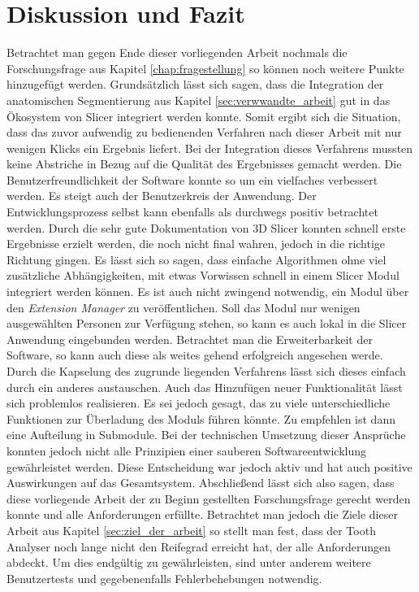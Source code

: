 \chapter{Diskussion und Fazit}
\label{chap:diskussion} Betrachtet man gegen Ende dieser vorliegenden Arbeit nochmals
die Forschungsfrage aus Kapitel \ref{chap:fragestellung} so können noch weitere Punkte
hinzugefügt werden. Grundsätzlich lässt sich sagen, dass die Integration der anatomischen
Segmentierung aus Kapitel \ref{sec:verwwandte_arbeit} gut in das Ökosystem von Slicer
integriert werden konnte. Somit ergibt sich die Situation, dass das zuvor aufwendig
zu bedienenden Verfahren nach dieser Arbeit mit nur wenigen Klicks ein Ergebnis liefert.
Bei der Integration dieses Verfahrens mussten keine Abstriche in Bezug auf die
Qualität des Ergebnisses gemacht werden. Die Benutzerfreundlichkeit der Software konnte
so um ein vielfaches verbessert werden. Es steigt auch der Benutzerkreis der
Anwendung. Der Entwicklungsprozess selbst kann ebenfalls als durchwegs positiv betrachtet
werden. Durch die sehr gute Dokumentation von 3D Slicer konnten schnell erste
Ergebnisse erzielt werden, die noch nicht final wahren, jedoch in die richtige
Richtung gingen. Es lässt sich so sagen, dass einfache Algorithmen ohne viel
zusätzliche Abhängigkeiten, mit etwas Vorwissen schnell in einem Slicer Modul integriert
werden können. Es ist auch nicht zwingend notwendig, ein Modul über den \textit{Extension
Manager} zu veröffentlichen. Soll das Modul nur wenigen ausgewählten Personen zur
Verfügung stehen, so kann es auch lokal in die Slicer Anwendung eingebunden
werden. Betrachtet man die Erweiterbarkeit der Software, so kann auch diese als
weites gehend erfolgreich angesehen werde. Durch die Kapselung des zugrunde liegenden
Verfahrens lässt sich dieses einfach durch ein anderes austauschen. Auch das
Hinzufügen neuer Funktionalität lässt sich problemlos realisieren. Es sei jedoch gesagt,
das zu viele unterschiedliche Funktionen zur Überladung des Moduls führen könnte. Zu 
empfehlen ist dann eine Aufteilung in Submodule. Bei der technischen
Umsetzung dieser Ansprüche konnten jedoch nicht alle Prinzipien einer sauberen Softwareentwicklung
gewährleistet werden. Diese Entscheidung war jedoch aktiv und hat auch positive
Auswirkungen auf das Gesamtsystem. Abschließend lässt sich also sagen, dass
diese vorliegende Arbeit der zu Beginn gestellten Forschungsfrage gerecht werden
konnte und alle Anforderungen erfüllte. Betrachtet man jedoch die Ziele dieser Arbeit
aus Kapitel \ref{sec:ziel_der_arbeit} so stellt man fest, dass der Tooth
Analyser noch lange nicht den Reifegrad erreicht hat, der alle Anforderungen abdeckt.
Um dies endgültig zu gewährleisten, sind unter anderem weitere Benutzertests und gegebenenfalls
Fehlerbehebungen notwendig.

